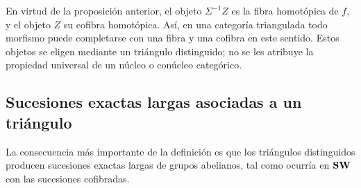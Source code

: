 \begin{obs}
En virtud de la proposición anterior, el objeto $\Sigma^{-1}Z$ es la fibra homotópica de $f$, y el objeto $Z$ su cofibra homotópica. Así, en una categoría triangulada todo morfismo puede completarse con una fibra y una cofibra en este sentido. Estos objetos se eligen mediante un triángulo distinguido; no se les atribuye la propiedad universal de un núcleo o conúcleo categórico.
\end{obs}

\subsection{Sucesiones exactas largas asociadas a un triángulo}

La consecuencia más importante de la definición es que los triángulos distinguidos producen sucesiones exactas largas de grupos abelianos, tal como ocurría en $\mathbf{SW}$ con las sucesiones cofibradas.

